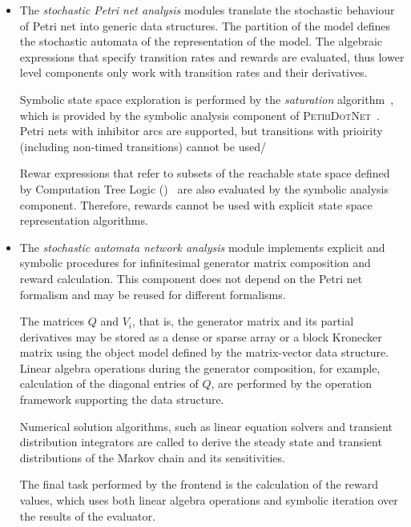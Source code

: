 \begin{itemize}
\item The \emph{stochastic Petri net analysis} modules translate the
  stochastic behaviour of Petri net into generic data structures. The
  partition of the model defines the stochastic automata of the
   representation of the model. The algebraic expressions
  that specify transition rates and rewards are evaluated, thus lower
  level components only work with transition rates and their
  derivatives.

  Symbolic state space exploration is performed by the
  \emph{saturation} algorithm~\citep{ciardo2001saturation}, which is
  provided by the symbolic analysis component of
  \textsc{PetriDotNet}~\citep{TDK2010_Darvas}. Petri nets with
  inhibitor arcs are supported, but transitions with prioirity
  (including non-timed transitions) cannot be used/

  Rewar expressions that refer to subsets of the reachable state space
  defined by Computation Tree Logic
  ()~\citep{DBLP:journals/fac/HanssonJ94} are also
  evaluated by the symbolic analysis component. Therefore,
   rewards cannot be used with explicit state space
  representation algorithms.

\item The \emph{stochastic automata network analysis} module
  implements explicit and symbolic procedures for infinitesimal
  generator matrix composition and reward calculation. This component
  does not depend on the Petri net formalism and may be reused for
  different formalisms.

  The matrices $Q$ and $V_i$, that is, the generator matrix and its
  partial derivatives may be stored as a dense or sparse array or a
  block Kronecker matrix using the object model defined by the
  matrix-vector data structure. Linear algebra operations during the
  generator composition, for example, calculation of the diagonal
  entries of $Q$, are performed by the operation framework supporting
  the data structure.

  Numerical solution algorithms, such as linear equation solvers and
  transient distribution integrators are called to derive the steady
  state and transient distributions of the Markov chain and its
  sensitivities.

  The final task performed by the frontend is the calculation of the
  reward values, which uses both linear algebra operations and
  symbolic iteration over the results of the  evaluator.
\end{itemize}

